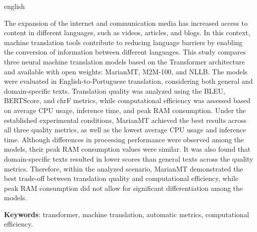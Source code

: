 \begin{resumo}[Abstract]

    \begin{otherlanguage*}{english}

        \noindent 
            The expansion of the internet and communication media has increased access to content in different languages, such as videos, articles, and blogs. In this context, machine translation tools contribute to reducing language barriers by enabling the conversion of information between different languages. This study compares three neural machine translation models based on the Transformer architecture and available with open weights: MarianMT, M2M-100, and NLLB. The models were evaluated in English-to-Portuguese translation, considering both general and domain-specific texts. Translation quality was analyzed using the BLEU, BERTScore, and chrF metrics, while computational efficiency was assessed based on average CPU usage, inference time, and peak RAM consumption. Under the established experimental conditions, MarianMT achieved the best results across all three quality metrics, as well as the lowest average CPU usage and inference time. Although differences in processing performance were observed among the models, their peak RAM consumption values were similar. It was also found that domain-specific texts resulted in lower scores than general texts across the quality metrics. Therefore, within the analyzed scenario, MarianMT demonstrated the best trade-off between translation quality and computational efficiency, while peak RAM consumption did not allow for significant differentiation among the models.
        \noindent  
        
        \textbf{Keywords}: transformer, machine translation, automatic metrics, computational efficiency.
 
    \end{otherlanguage*}

\end{resumo}